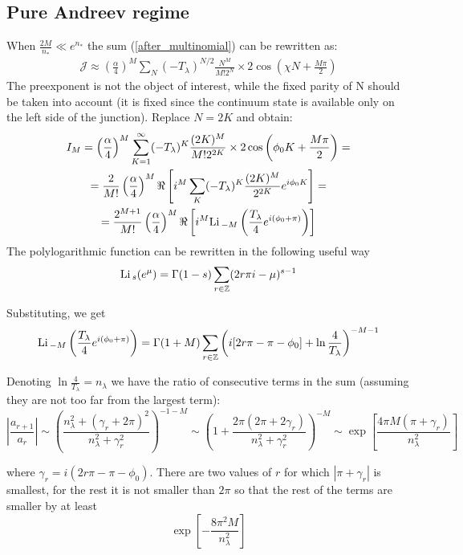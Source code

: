 \subsection{Pure Andreev regime}

When $ \frac{2M}{n_{*}}\ll e^{n_{*}} $ the sum (\ref{after_multinomial}) can be rewritten as:
\begin{gather}
	\mathcal{J}\approx\left(\frac{\alpha}{4}\right)^{M}\sum_{N}(-T_{\lambda})^{N/2}\frac{N^{M}}{M!2^{N}}\times2\cos\left(\chi N+\frac{M\pi}{2}\right)
\end{gather}
The preexponent is not the object of interest, while the fixed parity of N should be taken into account (it is fixed since the continuum state is available only on the left side of the junction). Replace $ N=2K $ and obtain:
\begin{multline}
	I_{M}=\left(\frac{\alpha}{4}\right)^{M}\sum_{K=1}^{\infty}(-T_{\lambda})^{K}\frac{(2K)^{M}}{M!2^{2K}}\times2\cos\left(\phi_{0}K+\frac{M\pi}{2}\right)=
	\\
	=\frac{2}{M!}\left(\frac{\alpha}{4}\right)^{M}\Re\left[i^{M}\sum_{K}(-T_{\lambda})^{K}\frac{(2K)^{M}}{2^{2K}}e^{i\phi_{0}K}\right]=\\=\frac{2^{M+1}}{M!}\left(\frac{\alpha}{4}\right)^{M}\Re\left[i^{M}\mathrm{Li}\,_{-M}\left(\frac{T_{\lambda}}{4}e^{i(\phi_{0}+\pi)}\right)\right]
\end{multline}
The polylogarithmic function can be rewritten in the following useful way
\[
\mathrm{Li}\,_{s}(e^{\mu})=\Gamma(1-s)\sum_{r\in\mathbb{Z}}(2r\pi i-\mu)^{s-1}
\]

Substituting, we get
\[
\mathrm{Li}\,_{-M}\left(\frac{T_{\lambda}}{4}e^{i(\phi_{0}+\pi)}\right)=\Gamma(1+M)\sum_{r\in\mathbb{Z}}\left(i[2r\pi-\pi-\phi_{0}]+\ln\frac{4}{T_{\lambda}}\right)^{-M-1}
\]

Denoting $\ln\frac{4}{T_{\lambda}}=n_{\lambda}$ we have the ratio
of consecutive terms in the sum (assuming they are not too far from
the largest term):
\[
\left|\frac{a_{r+1}}{a_{r}}\right|\sim\left(\frac{n_{\lambda}^{2}+(\gamma_{r}+2\pi)^{2}}{n_{\lambda}^{2}+\gamma_{r}^{2}}\right)^{-1-M}\sim\left(1+\frac{2\pi(2\pi+2\gamma_{r})}{n_{\lambda}^{2}+\gamma_{r}^{2}}\right)^{-M}\sim\exp\left[\frac{4\pi M(\pi+\gamma_{r})}{n_{\lambda}^{2}}\right]
\]

where $\gamma_{r}=i(2r\pi-\pi-\phi_{0})$. There are two values of
$r$ for which $|\pi+\gamma_{r}|$ is smallest, for the rest it is
not smaller than $2\pi$ so that the rest of the terms are smaller
by at least 
\[
\exp\left[-\frac{8\pi^{2}M}{n_{\lambda}^{2}}\right]
\]

